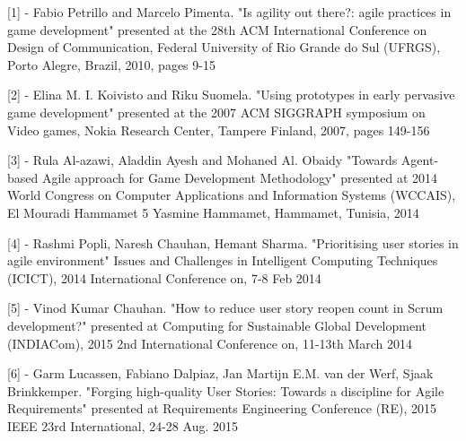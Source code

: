 \documentclass{scrartcl}
\begin{document}
[1] - Fabio Petrillo and Marcelo Pimenta. "Is agility out there?: agile practices in game development" presented at the 28th ACM International Conference on Design of Communication, Federal University of Rio Grande do Sul (UFRGS), Porto Alegre, Brazil, 2010, pages 9-15\par

[2] - Elina M. I. Koivisto and Riku Suomela. "Using prototypes in early pervasive game development" presented at the 2007 ACM SIGGRAPH symposium on Video games, Nokia Research Center, Tampere Finland, 2007, pages 149-156\par

[3] - Rula Al-azawi, Aladdin Ayesh and Mohaned Al. Obaidy "Towards Agent-based Agile approach for Game Development Methodology" presented at 2014 World Congress on Computer Applications and Information Systems (WCCAIS), El Mouradi Hammamet 5 Yasmine Hammamet, Hammamet, Tunisia, 2014\par

[4] - Rashmi Popli, Naresh Chauhan, Hemant Sharma. "Prioritising user stories in agile environment" Issues and Challenges in Intelligent Computing Techniques (ICICT), 2014 International Conference on, 7-8 Feb 2014\par

[5] - Vinod Kumar Chauhan. "How to reduce user story reopen count in Scrum development?" presented at Computing for Sustainable Global Development (INDIACom), 2015 2nd International Conference on, 11-13th March 2014\par

[6] - Garm Lucassen, Fabiano Dalpiaz, Jan Martijn E.M. van der Werf, Sjaak Brinkkemper. "Forging high-quality User Stories: Towards a discipline for Agile Requirements" presented at Requirements Engineering Conference (RE), 2015 IEEE 23rd International, 24-28 Aug. 2015\par




\end{document}
